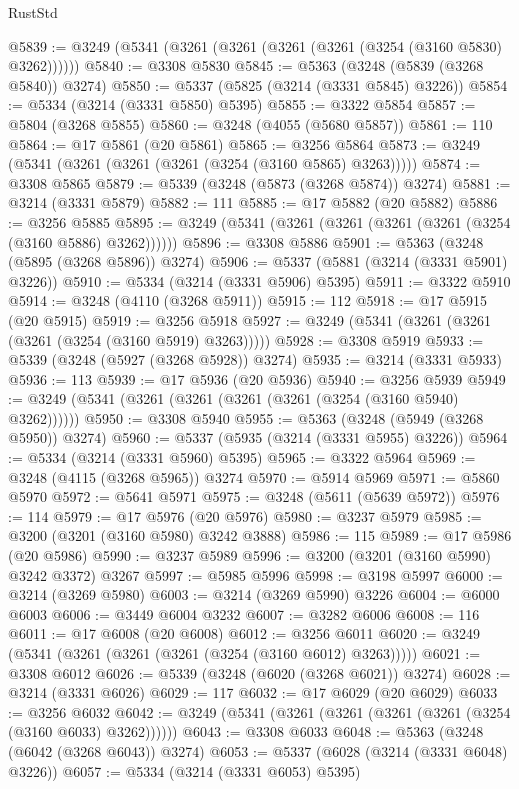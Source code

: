\begin{lexlean}{RustStd}
\begin{coremodule}
@5839 := @3249 (@5341 (@3261 (@3261 (@3261 (@3261 (@3254 (@3160 @5830) @3262))))))
@5840 := @3308 @5830
@5845 := @5363 (@3248 (@5839 (@3268 @5840)) @3274)
@5850 := @5337 (@5825 (@3214 (@3331 @5845) @3226))
@5854 := @5334 (@3214 (@3331 @5850) @5395)
@5855 := @3322 @5854
@5857 := @5804 (@3268 @5855)
@5860 := @3248 (@4055 (@5680 @5857))
@5861 := 110
@5864 := @17 @5861 (@20 @5861)
@5865 := @3256 @5864
@5873 := @3249 (@5341 (@3261 (@3261 (@3261 (@3254 (@3160 @5865) @3263)))))
@5874 := @3308 @5865
@5879 := @5339 (@3248 (@5873 (@3268 @5874)) @3274)
@5881 := @3214 (@3331 @5879)
@5882 := 111
@5885 := @17 @5882 (@20 @5882)
@5886 := @3256 @5885
@5895 := @3249 (@5341 (@3261 (@3261 (@3261 (@3261 (@3254 (@3160 @5886) @3262))))))
@5896 := @3308 @5886
@5901 := @5363 (@3248 (@5895 (@3268 @5896)) @3274)
@5906 := @5337 (@5881 (@3214 (@3331 @5901) @3226))
@5910 := @5334 (@3214 (@3331 @5906) @5395)
@5911 := @3322 @5910
@5914 := @3248 (@4110 (@3268 @5911))
@5915 := 112
@5918 := @17 @5915 (@20 @5915)
@5919 := @3256 @5918
@5927 := @3249 (@5341 (@3261 (@3261 (@3261 (@3254 (@3160 @5919) @3263)))))
@5928 := @3308 @5919
@5933 := @5339 (@3248 (@5927 (@3268 @5928)) @3274)
@5935 := @3214 (@3331 @5933)
@5936 := 113
@5939 := @17 @5936 (@20 @5936)
@5940 := @3256 @5939
@5949 := @3249 (@5341 (@3261 (@3261 (@3261 (@3261 (@3254 (@3160 @5940) @3262))))))
@5950 := @3308 @5940
@5955 := @5363 (@3248 (@5949 (@3268 @5950)) @3274)
@5960 := @5337 (@5935 (@3214 (@3331 @5955) @3226))
@5964 := @5334 (@3214 (@3331 @5960) @5395)
@5965 := @3322 @5964
@5969 := @3248 (@4115 (@3268 @5965)) @3274
@5970 := @5914 @5969
@5971 := @5860 @5970
@5972 := @5641 @5971
@5975 := @3248 (@5611 (@5639 @5972))
@5976 := 114
@5979 := @17 @5976 (@20 @5976)
@5980 := @3237 @5979
@5985 := @3200 (@3201 (@3160 @5980) @3242 @3888)
@5986 := 115
@5989 := @17 @5986 (@20 @5986)
@5990 := @3237 @5989
@5996 := @3200 (@3201 (@3160 @5990) @3242 @3372) @3267
@5997 := @5985 @5996
@5998 := @3198 @5997
@6000 := @3214 (@3269 @5980)
@6003 := @3214 (@3269 @5990) @3226
@6004 := @6000 @6003
@6006 := @3449 @6004 @3232
@6007 := @3282 @6006
@6008 := 116
@6011 := @17 @6008 (@20 @6008)
@6012 := @3256 @6011
@6020 := @3249 (@5341 (@3261 (@3261 (@3261 (@3254 (@3160 @6012) @3263)))))
@6021 := @3308 @6012
@6026 := @5339 (@3248 (@6020 (@3268 @6021)) @3274)
@6028 := @3214 (@3331 @6026)
@6029 := 117
@6032 := @17 @6029 (@20 @6029)
@6033 := @3256 @6032
@6042 := @3249 (@5341 (@3261 (@3261 (@3261 (@3261 (@3254 (@3160 @6033) @3262))))))
@6043 := @3308 @6033
@6048 := @5363 (@3248 (@6042 (@3268 @6043)) @3274)
@6053 := @5337 (@6028 (@3214 (@3331 @6048) @3226))
@6057 := @5334 (@3214 (@3331 @6053) @5395)

\end{coremodule}
\end{lexlean}
